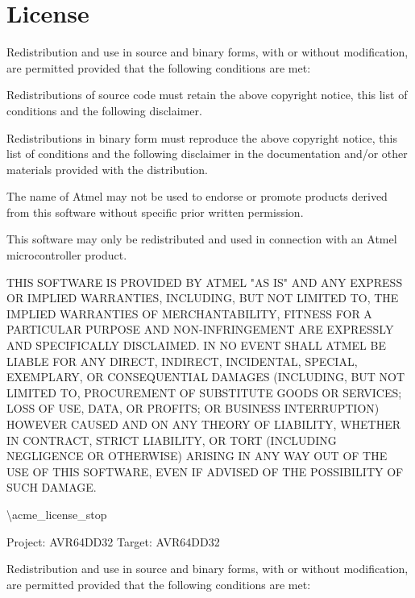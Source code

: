 \chapter{License }
\hypertarget{_license}{}\label{_license}
Redistribution and use in source and binary forms, with or without modification, are permitted provided that the following conditions are met:\+


\begin{DoxyEnumerate}
\item Redistributions of source code must retain the above copyright notice, this list of conditions and the following disclaimer.
\item Redistributions in binary form must reproduce the above copyright notice, this list of conditions and the following disclaimer in the documentation and/\+or other materials provided with the distribution.
\item The name of Atmel may not be used to endorse or promote products derived from this software without specific prior written permission.
\item This software may only be redistributed and used in connection with an Atmel microcontroller product.
\end{DoxyEnumerate}

THIS SOFTWARE IS PROVIDED BY ATMEL "{}\+AS IS"{} AND ANY EXPRESS OR IMPLIED WARRANTIES, INCLUDING, BUT NOT LIMITED TO, THE IMPLIED WARRANTIES OF MERCHANTABILITY, FITNESS FOR A PARTICULAR PURPOSE AND NON-\/\+INFRINGEMENT ARE EXPRESSLY AND SPECIFICALLY DISCLAIMED. IN NO EVENT SHALL ATMEL BE LIABLE FOR ANY DIRECT, INDIRECT, INCIDENTAL, SPECIAL, EXEMPLARY, OR CONSEQUENTIAL DAMAGES (INCLUDING, BUT NOT LIMITED TO, PROCUREMENT OF SUBSTITUTE GOODS OR SERVICES; LOSS OF USE, DATA, OR PROFITS; OR BUSINESS INTERRUPTION) HOWEVER CAUSED AND ON ANY THEORY OF LIABILITY, WHETHER IN CONTRACT, STRICT LIABILITY, OR TORT (INCLUDING NEGLIGENCE OR OTHERWISE) ARISING IN ANY WAY OUT OF THE USE OF THIS SOFTWARE, EVEN IF ADVISED OF THE POSSIBILITY OF SUCH DAMAGE.

\textbackslash{}acme\+\_\+license\+\_\+stop

Project:\+ AVR64\+DD32 Target:\+ AVR64\+DD32

Redistribution and use in source and binary forms, with or without modification, are permitted provided that the following conditions are met:\+



